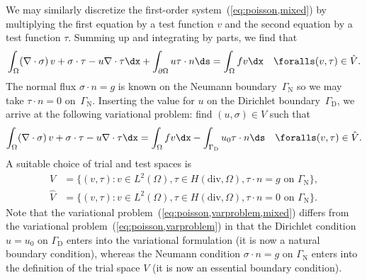 We may similarly discretize the first-order
system~(\ref{eq:poisson,mixed}) by multiplying the first equation by a
test function $v$ and the second equation by a test function
$\tau$. Summing up and integrating by parts, we find that
\begin{equation}
  \int_{\Omega} (\nabla \cdot \sigma) \, v + \sigma \cdot \tau
  - u \nabla \cdot \tau \dx +
  \int_{\partial\Omega} u \tau \cdot n \ds
  = \int_{\Omega} f v \dx
  \quad \foralls (v, \tau) \in \hat{V}.
\end{equation}
The normal flux $\sigma \cdot n = g$ is known on the Neumann
boundary~$\Gamma_{\mathrm{N}}$ so we may take $\tau \cdot n = 0$
on~$\Gamma_{\mathrm{N}}$.  Inserting the value for $u$ on the
Dirichlet boundary~$\Gamma_{\mathrm{D}}$, we arrive at the following
variational problem: find $(u, \sigma) \in V$ such that
\begin{equation} \label{eq:poisson,varproblem,mixed}
  \int_{\Omega} (\nabla \cdot \sigma) \, v + \sigma \cdot \tau
  - u \nabla \cdot \tau \dx
  = \int_{\Omega} f v \dx - \int_{\Gamma_{\mathrm{D}}} u_0 \tau \cdot n \ds
  \quad \foralls (v, \tau) \in \hat{V}.
\end{equation}
A suitable choice of trial and test spaces is
\begin{equation}
  \begin{split}
    V       &= \{(v, \tau) : v \in L^2(\Omega), \tau \in H(\mathrm{div}, \Omega), \tau \cdot n = g \mbox{ on } \Gamma_{\mathrm{N}}\}, \\
    \hat{V} &= \{(v, \tau) : v \in L^2(\Omega), \tau \in H(\mathrm{div}, \Omega), \tau \cdot n = 0 \mbox{ on } \Gamma_{\mathrm{N}}\}.
  \end{split}
\end{equation}
Note that the variational problem~(\ref{eq:poisson,varproblem,mixed})
differs from the variational problem~(\ref{eq:poisson,varproblem}) in
that the Dirichlet condition $u = u_0$ on $\Gamma_{\mathrm{D}}$ enters
into the variational formulation (it is now a natural boundary
condition), whereas the Neumann condition $\sigma \cdot n = g$ on
$\Gamma_{\mathrm{N}}$ enters into the definition of the trial space
$V$ (it is now an essential boundary condition).

